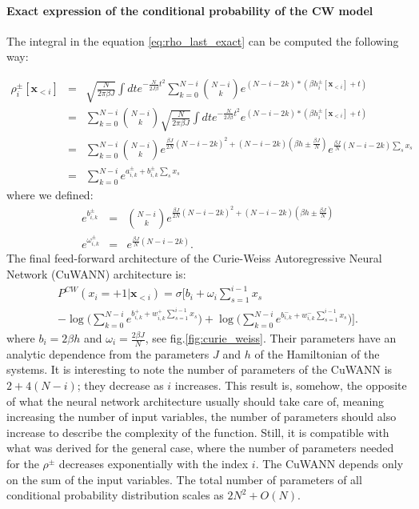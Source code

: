  \paragraph{Exact expression of the conditional probability of the CW model}
 The integral in the equation \ref{eq:rho_last_exact} can be computed the following way:

 \begin{eqnarray*}
 \rho_i^{\pm}[\mathbf{x}_{<i}] &=& \sqrt{\frac{N}{2\pi \beta J}}\int dt e^{-\frac{N}{2J \beta}t^{2}} 
 \sum_{k=0}^{N-i} \binom{N-i}{k} e^{(N-i-2k)*(\beta h_i^{\pm}[\mathbf{x}_{<i}] + t)}\\
 &=& \sum_{k=0}^{N-i} \binom{N-i}{k} \sqrt{\frac{N}{2\pi \beta J}}\int dt e^{-\frac{N}{2J \beta}t^{2}} 
  e^{(N-i-2k)*(\beta h_i^{\pm}[\mathbf{x}_{<i}] + t)}\\
&=& \sum_{k=0}^{N-i} \binom{N-i}{k}e^{\frac{\beta J}{2N}\left(N-i-2k\right)^{2}+\left(N-i-2k\right)\left(\beta h \pm \frac{\beta J}{N}\right)} e^{\frac{\beta J}{N}\left(N-i-2k\right) \sum_s x_s} \\
&=& \sum_{k=0}^{N-i} e^{a_{i,k}^{\pm} + b_{i,k}^{\pm} \sum_s x_s} 
\end{eqnarray*}
where we defined:
\begin{eqnarray}
\label{eq:params}
e^{b_{i,k}^{\pm}} & = & \binom{N-i}{k}e^{\frac{\beta J}{2N}\left(N-i-2k\right)^{2}+\left(N-i-2k\right)\left(\beta h \pm \frac{\beta J}{N}\right)}\\
e^{\omega_{i,k}^{\pm}} & = & e^{\frac{\beta J}{N}\left(N-i-2k\right)}.
\end{eqnarray}
The final feed-forward architecture of the Curie-Weiss Autoregressive Neural Network (CuWANN) architecture is:
\begin{multline}
\label{eq:curie_weiss_cond}
P^{CW}\left(x_{i}=+1|\mathbf{x}_{<i}\right)  =   \sigma \bigg[b_{i}+\omega_{i}\sum_{s=1}^{i-1}x_{s}\\
-\log\big(\sum_{k=0}^{N-i}e^{b_{i,k}^{+} + 
w_{i,k}^{+}\sum_{s=1}^{i-1}x_{s}}\big)+\log\big(\sum_{k=0}^{N-i}e^{b_{i,k}^{-} + w_{i,k}^{-}\sum_{s=1}^{i-1}x_{s}}\big)\bigg].
\end{multline}
where $b_i=2\beta h$ and $\omega_i=\frac{2\beta J}{N}$, see fig.\ref{fig:curie_weiss}. Their parameters have an analytic dependence from the parameters $J$ and $h$ of the Hamiltonian of the systems. 
It is interesting to note the number of parameters of the CuWANN is $2+4(N-i)$; they decrease as $i$ increases. This result is, somehow, the opposite of what the neural network architecture usually should take care of, meaning increasing the number of input variables, the number of parameters should also increase to describe the complexity of the function. Still, it is compatible with what was derived for the general case, where the number of parameters needed for the $\rho^{\pm}$ decreases exponentially with the index $i$. The CuWANN depends only on the sum of the input variables.
The total number of parameters of all conditional probability distribution scales as $2N^2+ O(N)$. 



